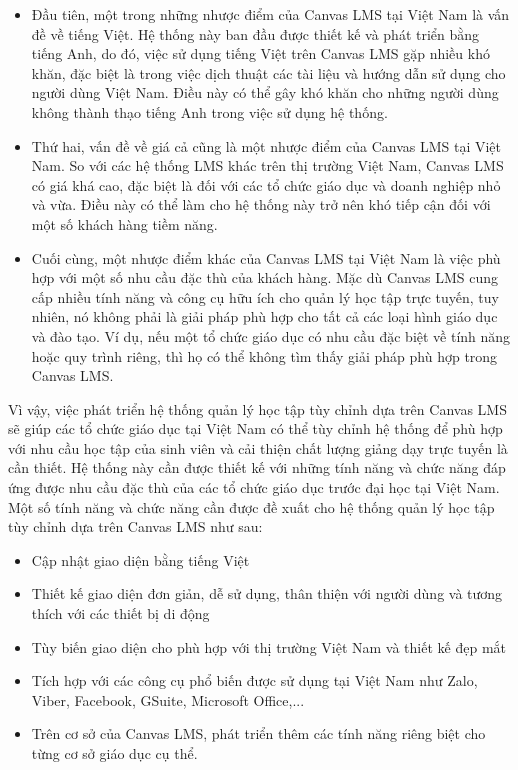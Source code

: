 \documentclass[../Thesis.tex]{subfiles}
\begin{document}
\begin{itemize}
    \item Đầu tiên, một trong những nhược điểm của Canvas LMS tại Việt Nam là vấn đề về tiếng Việt. Hệ thống này ban đầu được thiết kế và phát triển bằng tiếng Anh, do đó, việc sử dụng tiếng Việt trên Canvas LMS gặp nhiều khó khăn, đặc biệt là trong việc dịch thuật các tài liệu và hướng dẫn sử dụng cho người dùng Việt Nam. Điều này có thể gây khó khăn cho những người dùng không thành thạo tiếng Anh trong việc sử dụng hệ thống.
    \item Thứ hai, vấn đề về giá cả cũng là một nhược điểm của Canvas LMS tại Việt Nam. So với các hệ thống LMS khác trên thị trường Việt Nam, Canvas LMS có giá khá cao, đặc biệt là đối với các tổ chức giáo dục và doanh nghiệp nhỏ và vừa. Điều này có thể làm cho hệ thống này trở nên khó tiếp cận đối với một số khách hàng tiềm năng.
    \item Cuối cùng, một nhược điểm khác của Canvas LMS tại Việt Nam là việc phù hợp với một số nhu cầu đặc thù của khách hàng. Mặc dù Canvas LMS cung cấp nhiều tính năng và công cụ hữu ích cho quản lý học tập trực tuyến, tuy nhiên, nó không phải là giải pháp phù hợp cho tất cả các loại hình giáo dục và đào tạo. Ví dụ, nếu một tổ chức giáo dục có nhu cầu đặc biệt về tính năng hoặc quy trình riêng, thì họ có thể không tìm thấy giải pháp phù hợp trong Canvas LMS.
\end{itemize}

Vì vậy,  việc phát triển hệ thống quản lý học tập tùy chỉnh dựa trên Canvas LMS sẽ giúp các tổ chức giáo dục tại Việt Nam có thể tùy chỉnh hệ thống để phù hợp với nhu cầu học tập của sinh viên và cải thiện chất lượng giảng dạy trực tuyến là cần thiết. Hệ thống này cần được thiết kế với những tính năng và chức năng đáp ứng được nhu cầu đặc thù của các tổ chức giáo dục trước đại học tại Việt Nam. Một số tính năng và chức năng cần được đề xuất cho hệ thống quản lý học tập tùy chỉnh dựa trên Canvas LMS như sau:
\begin{itemize}
    \item Cập nhật giao diện bằng tiếng Việt
    \item Thiết kế giao diện đơn giản, dễ sử dụng, thân thiện với người dùng và tương thích với các thiết bị di động
    \item Tùy biến giao diện cho phù hợp với thị trường Việt Nam và thiết kế đẹp mắt
    \item Tích hợp với các công cụ phổ biến được sử dụng tại Việt Nam như Zalo, Viber, Facebook, GSuite, Microsoft Office,...
    \item Trên cơ sở của Canvas LMS, phát triển thêm các tính năng riêng biệt cho từng cơ sở giáo dục cụ thể.
\end{itemize}
\end{document}
